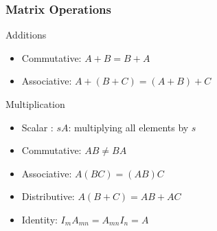 








  \begin{frame}[fragile]\frametitle{Matrix Operations}
Additions
\begin{itemize}
\item Commutative: $A + B = B + A$
\item Associative: $A + (B + C) = (A + B) + C$
\end{itemize}
Multiplication
\begin{itemize}
\item Scalar : $sA$: multiplying all elements by $s$
\item Commutative: $AB \neq BA$
\item Associative: $A(BC)  =  (AB)C$
\item Distributive: $A(B + C)  =  AB + AC$
\item Identity: $ I_mA_{mn}  =  A_{mn}I_n  =  A$
\end{itemize}
\end{frame}

